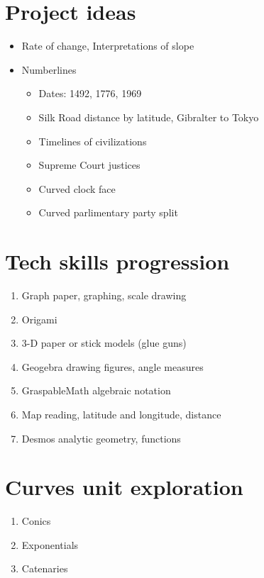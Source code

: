 \documentclass[12pt, twoside]{article}
\begin{document}
\section*{Project ideas}
\begin{itemize}
  \item Rate of change, Interpretations of slope
  \item Numberlines
  \begin{itemize}
    \item Dates: 1492, 1776, 1969
    \item Silk Road distance by latitude, Gibralter to Tokyo
    \item Timelines of civilizations
    \item Supreme Court justices
    \item Curved clock face 
    \item Curved parlimentary party split
  \end{itemize}
\end{itemize}

\section*{Tech skills progression}
\begin{enumerate}
  \item Graph paper, graphing, scale drawing
  \item Origami
  \item 3-D paper or stick models (glue guns)
  \item Geogebra drawing figures, angle measures
  \item GraspableMath algebraic notation
  \item Map reading, latitude and longitude, distance
  \item Desmos analytic geometry, functions
\end{enumerate}

\section*{Curves unit exploration}
\begin{enumerate}
  \item Conics
  \item Exponentials
  \item Catenaries
\end{enumerate}
\end{document}
